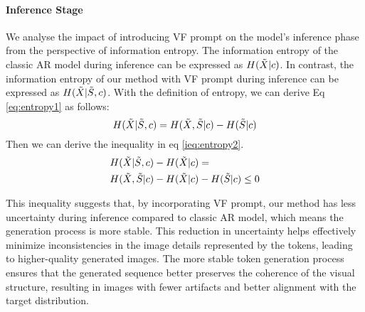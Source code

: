 \paragraph{Inference Stage} We analyse the impact of introducing VF prompt on the model's inference phase from the perspective of information entropy. The information entropy of the classic AR model during inference can be expressed as $H(\Tilde{X}|c)$. In contrast, the information entropy of our method with VF prompt during inference can be expressed as $H(\Tilde{X}|\Tilde{S},c)$.
With the definition of entropy, we can derive Eq \ref{eq:entropy1} as follows:
\begin{equation}
    H(\Tilde{X}|\Tilde{S},c) = H(\Tilde{X},\Tilde{S}|c) - H(\Tilde{S}|c)
    \label{eq:entropy1}
\end{equation}
Then we can derive the inequality in eq \ref{ieq:entropy2}.
\begin{align}
    &H(\Tilde{X}|\Tilde{S},c) - H(\Tilde{X}|c) = \nonumber \\
    &H(\Tilde{X},\Tilde{S}|c) - H(\Tilde{X}|c) - H(\Tilde{S}|c) \leq 0
    \label{ieq:entropy2}
\end{align}


This inequality suggests that, by incorporating VF prompt, our method has less uncertainty during inference compared to classic AR model, which means the generation process is more stable. This reduction in uncertainty helps effectively minimize inconsistencies in the image details represented by the tokens, leading to higher-quality generated images. The more stable token generation process ensures that the generated sequence better preserves the coherence of the visual structure, resulting in images with fewer artifacts and better alignment with the target distribution. 


